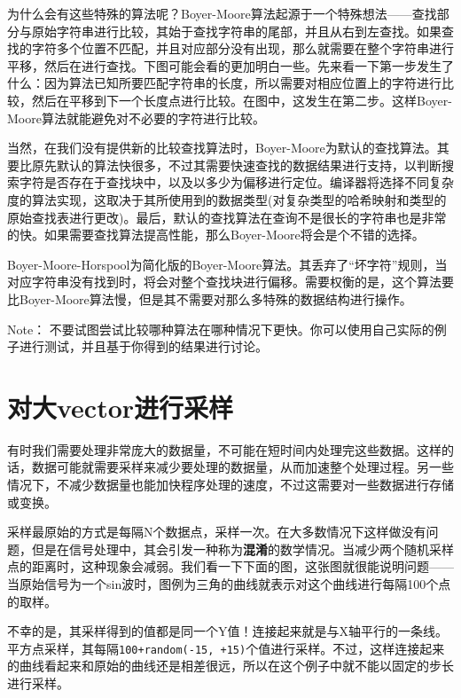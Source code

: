 为什么会有这些特殊的算法呢？Boyer-Moore算法起源于一个特殊想法——查找部分与原始字符串进行比较，其始于查找字符串的尾部，并且从右到左查找。如果查找的字符多个位置不匹配，并且对应部分没有出现，那么就需要在整个字符串进行平移，然后在进行查找。下图可能会看的更加明白一些。先来看一下第一步发生了什么：因为算法已知所要匹配字符串的长度，所以需要对相应位置上的字符进行比较，然后在平移到下一个长度点进行比较。在图中，这发生在第二步。这样Boyer-Moore算法就能避免对不必要的字符进行比较。


当然，在我们没有提供新的比较查找算法时，Boyer-Moore为默认的查找算法。其要比原先默认的算法快很多，不过其需要快速查找的数据结果进行支持，以判断搜索字符是否存在于查找块中，以及以多少为偏移进行定位。编译器将选择不同复杂度的算法实现，这取决于其所使用到的数据类型(对复杂类型的哈希映射和类型的原始查找表进行更改)。最后，默认的查找算法在查询不是很长的字符串也是非常的快。如果需要查找算法提高性能，那么Boyer-Moore将会是个不错的选择。

Boyer-Moore-Horspool为简化版的Boyer-Moore算法。其丢弃了“坏字符”规则，当对应字符串没有找到时，将会对整个查找块进行偏移。需要权衡的是，这个算法要比Boyer-Moore算法慢，但是其不需要对那么多特殊的数据结构进行操作。

\begin{myInfoBox}
Note： 不要试图尝试比较哪种算法在哪种情况下更快。你可以使用自己实际的例子进行测试，并且基于你得到的结果进行讨论。
\end{myInfoBox}


\section{对大vector进行采样}

有时我们需要处理非常庞大的数据量，不可能在短时间内处理完这些数据。这样的话，数据可能就需要采样来减少要处理的数据量，从而加速整个处理过程。另一些情况下，不减少数据量也能加快程序处理的速度，不过这需要对一些数据进行存储或变换。

采样最原始的方式是每隔N个数据点，采样一次。在大多数情况下这样做没有问题，但是在信号处理中，其会引发一种称为\textbf{混淆}的数学情况。当减少两个随机采样点的距离时，这种现象会减弱。我们看一下下面的图，这张图就很能说明问题——当原始信号为一个sin波时，图例为三角的曲线就表示对这个曲线进行每隔100个点的取样。


不幸的是，其采样得到的值都是同一个Y值！连接起来就是与X轴平行的一条线。平方点采样，其每隔\texttt{100+random(-15, +15)}个值进行采样。不过，这样连接起来的曲线看起来和原始的曲线还是相差很远，所以在这个例子中就不能以固定的步长进行采样。

